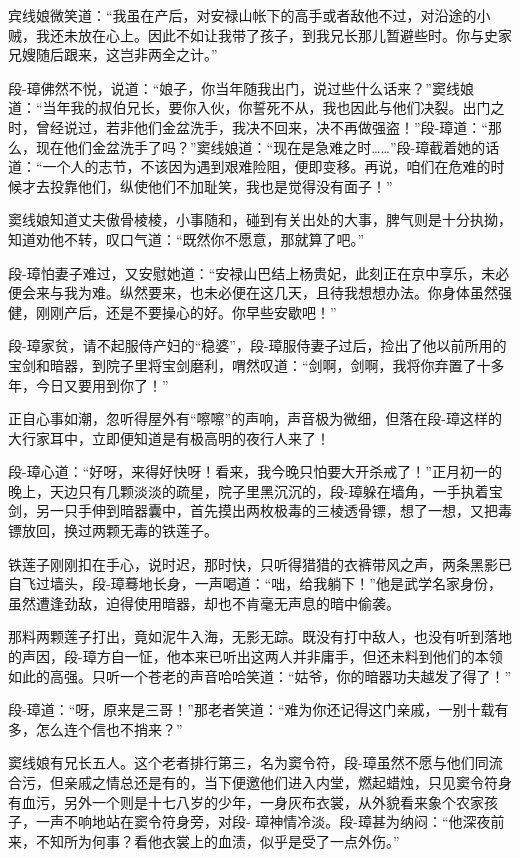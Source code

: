 \documentclass[12pt,oneside]{book}
\begin{document}
宾线娘微笑道：``我虽在产后，对安禄山帐下的高手或者敌他不过，对沿途的小贼，我还未放在心上。因此不如让我带了孩子，到我兄长那儿暂避些时。你与史家兄嫂随后跟来，这岂非两全之计。''

段-璋佛然不悦，说道：``娘子，你当年随我出门，说过些什么话来？''窦线娘道：``当年我的叔伯兄长，要你入伙，你誓死不从，我也因此与他们决裂。出门之时，曾经说过，若非他们金盆洗手，我决不回来，决不再做强盗！''段-璋道：``那么，现在他们金盆洗手了吗？''窦线娘道：``现在是急难之时\ldots\ldots{}''段-璋截着她的话道：``一个人的志节，不该因为遇到艰难险阻，便即变移。再说，咱们在危难的时候才去投靠他们，纵使他们不加耻笑，我也是觉得没有面子！''

窦线娘知道丈夫傲骨棱棱，小事随和，碰到有关出处的大事，脾气则是十分执拗，知道劝他不转，叹口气道：``既然你不愿意，那就算了吧。''

段-璋怕妻子难过，又安慰她道：``安禄山巴结上杨贵妃，此刻正在京中享乐，未必便会来与我为难。纵然要来，也未必便在这几天，且待我想想办法。你身体虽然强健，刚刚产后，还是不要操心的好。你早些安歇吧！''

段-璋家贫，请不起服侍产妇的``稳婆''，段-璋服侍妻子过后，捡出了他以前所用的宝剑和暗器，到院子里将宝剑磨利，喟然叹道：``剑啊，剑啊，我将你弃置了十多年，今日又要用到你了！''

正自心事如潮，忽听得屋外有``嚓嚓''的声响，声音极为微细，但落在段-璋这样的大行家耳中，立即便知道是有极高明的夜行人来了！

段-璋心道：``好呀，来得好快呀！看来，我今晚只怕要大开杀戒了！''正月初一的晚上，天边只有几颗淡淡的疏星，院子里黑沉沉的，段-璋躲在墙角，一手执着宝剑，另一只手伸到暗器囊中，首先摸出两枚极毒的三棱透骨镖，想了一想，又把毒镖放回，换过两颗无毒的铁莲子。

铁莲子刚刚扣在手心，说时迟，那时快，只听得猎猎的衣裤带风之声，两条黑影已自飞过墙头，段-璋蓦地长身，一声喝道：``咄，给我躺下！''他是武学名家身份，虽然遭逢劲敌，迫得使用暗器，却也不肯毫无声息的暗中偷袭。

那料两颗莲子打出，竟如泥牛入海，无影无踪。既没有打中敌人，也没有听到落地的声因，段-璋方自一怔，他本来已听出这两人并非庸手，但还未料到他们的本领如此的高强。只听一个苍老的声音哈哈笑道：``姑爷，你的暗器功夫越发了得了！''

段-璋道：``呀，原来是三哥！''那老者笑道：``难为你还记得这门亲戚，一别十载有多，怎么连个信也不捎来？''

窦线娘有兄长五人。这个老者排行第三，名为窦令符，段-璋虽然不愿与他们同流合污，但亲戚之情总还是有的，当下便邀他们进入内堂，燃起蜡烛，只见窦令符身有血污，另外一个则是十七八岁的少年，一身灰布衣裳，从外貌看来象个农家孩子，一声不响地站在窦令符身旁，对段-
璋神情冷淡。段-璋甚为纳闷：``他深夜前来，不知所为何事？看他衣裳上的血渍，似乎是受了一点外伤。''
\end{document}

